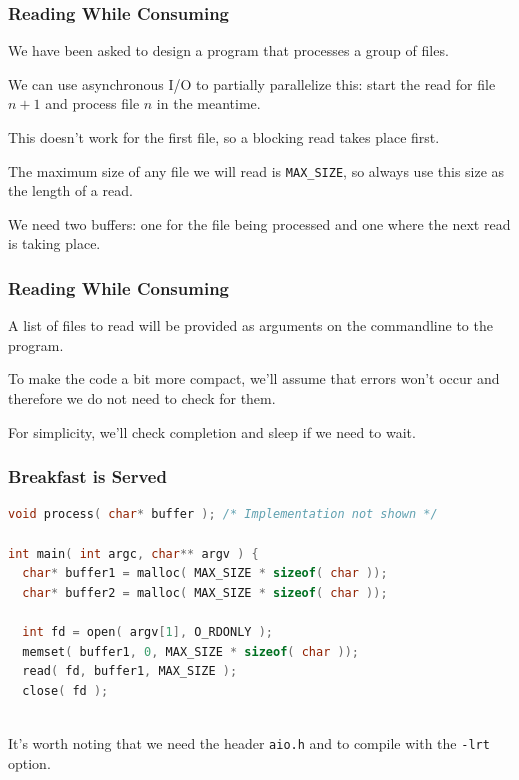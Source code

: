 \begin{frame}
\frametitle{Reading While Consuming}

We have been asked to design a program that processes a group of files. 

We can use asynchronous I/O to partially parallelize this: start the read for file $n+1$ and process file $n$ in the meantime. 

This doesn't work for the first file, so a blocking read takes place first.

The maximum size of any file we will read is \texttt{MAX\_SIZE}, so always use this size as the length of a read.

We need two buffers: one for the file being processed and one where the next read is taking place.

\end{frame}


\begin{frame}
\frametitle{Reading While Consuming}

A list of files to read will be provided as arguments on the commandline to the program. 

To make the code a bit more compact, we'll assume that errors won't occur and therefore we do not need to check for them.

For simplicity, we'll check completion and sleep if we need to wait.

\end{frame}


\begin{frame}[fragile]
\frametitle{Breakfast is Served}

\begin{lstlisting}[language=C]
void process( char* buffer ); /* Implementation not shown */

int main( int argc, char** argv ) {
  char* buffer1 = malloc( MAX_SIZE * sizeof( char ));
  char* buffer2 = malloc( MAX_SIZE * sizeof( char ));
  
  int fd = open( argv[1], O_RDONLY );
  memset( buffer1, 0, MAX_SIZE * sizeof( char ));
  read( fd, buffer1, MAX_SIZE );
  close( fd );
  
\end{lstlisting}

It's worth noting that we need the header \texttt{aio.h} and to compile with the \texttt{-lrt} option.
  

\end{frame}

